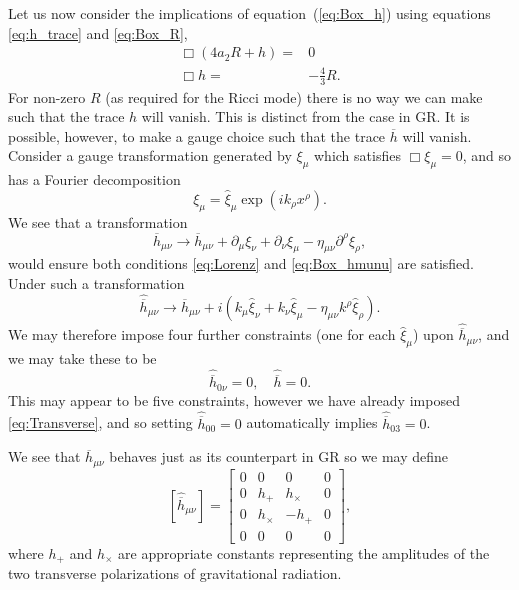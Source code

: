 \documentclass[a4paper, 11pt, titlepage, twoside]{report}
\newcommand{\eqnref}[1]{equation~(\ref{eq:#1})}
\begin{document}
{Let us now consider the implications of \eqnref{Box_h} using equations \eqref{eq:h_trace} and \eqref{eq:Box_R},
\begin{align}
\Box\left(4a_2R + h\right) = {} & 0 \nonumber \\
\Box h = {} & -\frac{4}{3}R.
\end{align}
For non-zero $R$ (as required for the Ricci mode) there is no way we can make such that the trace $h$ will vanish. This is distinct from the case in GR. It is possible, however, to make a gauge choice such that the trace $\overline{h}$ will vanish. Consider a gauge transformation generated by $\xi_\mu$ which satisfies $\Box \xi_\mu = 0$, and so has a Fourier decomposition
\begin{equation}
\xi_\mu = \widehat{\xi}_\mu \exp\left(ik_\rho x^\rho\right).
\end{equation}
We see that a transformation
\begin{equation}
\overline{h}_{\mu\nu} \rightarrow \overline{h}_{\mu\nu} + \partial_\mu\xi_\nu + \partial_\nu\xi_\mu - \eta_{\mu\nu}\partial^\rho\xi_\rho,
\end{equation}
would ensure both conditions \eqref{eq:Lorenz} and \eqref{eq:Box_hmunu} are satisfied. Under such a transformation
\begin{equation}
\widehat{\overline{h}}_{\mu\nu} \rightarrow \widehat{\overline{h}}_{\mu\nu} + i\left(k_\mu\widehat{\xi}_\nu + k_\nu\widehat{\xi}_\mu - \eta_{\mu\nu}k^\rho\widehat{\xi}_\rho\right).
\end{equation}
We may therefore impose four further constraints (one for each $\widehat{\xi}_\mu$) upon $\widehat{\overline{h}}_{\mu\nu}$, and we may take these to be
\begin{equation}
\widehat{\overline{h}}_{0\nu} = 0, \quad \widehat{\overline{h}} = 0.
\end{equation}
This may appear to be five constraints, however we have already imposed \eqref{eq:Transverse}, and so setting $\widehat{\overline{h}}_{00} = 0$ automatically implies $\widehat{\overline{h}}_{03} = 0$.

We see that $\overline{h}_{\mu\nu}$ behaves just as its counterpart in GR so we may define
\begin{equation}
\left[\widehat{\overline{h}}_{\mu\nu}\right] =
\begin{bmatrix}
0 & 0 & 0 & 0\\
0 & h_+ & h_\times & 0\\
0 & h_\times & -h_+ & 0\\
0 & 0 & 0 & 0
\end{bmatrix},
\end{equation}
where $h_+$ and $h_\times$ are appropriate constants representing the amplitudes of the two transverse polarizations of gravitational radiation.

}
\end{document}
